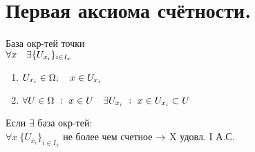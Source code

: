\documentclass[geometry.tex]{subfiles}
\begin{document}
  \section{Первая аксиома счётности.}

  \begin{definition}
      База окр-тей точки\\
      $\forall x \quad \exists \{U_{x_i}\}_{i \in I_x}$\\
      \begin{enumerate}
          \item $U_{x_i} \in \Omega; \quad x \in U_{x_i}$
          \item $\forall U \in \Omega \ : \ x \in U \quad \exists U_{x_i} \ : \ x \in U_{x_i} \subset U$
      \end{enumerate}
  \end{definition}

  \begin{definition}
      Если $\exists$  база окр-тей:\\
      $\forall x \ \{U_{x_i}\}_{i \in I_x}$ не более чем счетное $\rightarrow$ X удовл. I А.С.
  \end{definition}
\end{document}
